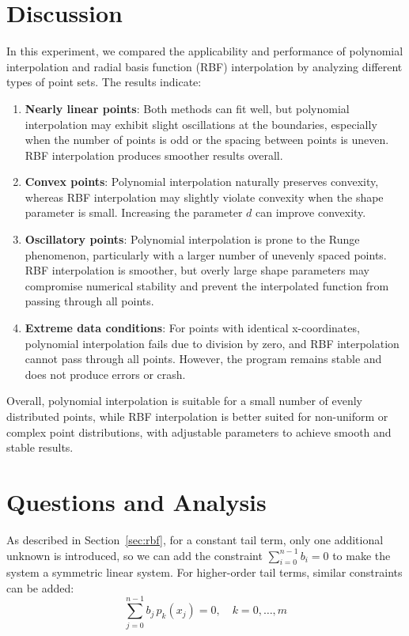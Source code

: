 \documentclass[12pt,a4paper]{report}
\begin{document}
    \chapter{Discussion}
        In this experiment, we compared the applicability and performance of polynomial interpolation and radial basis function (RBF) interpolation by analyzing different types of point sets. The results indicate:

        \begin{enumerate}
            \item \textbf{Nearly linear points}: Both methods can fit well, but polynomial interpolation may exhibit slight oscillations at the boundaries, especially when the number of points is odd or the spacing between points is uneven. RBF interpolation produces smoother results overall.
            \item \textbf{Convex points}: Polynomial interpolation naturally preserves convexity, whereas RBF interpolation may slightly violate convexity when the shape parameter is small. Increasing the parameter $d$ can improve convexity.
            \item \textbf{Oscillatory points}: Polynomial interpolation is prone to the Runge phenomenon, particularly with a larger number of unevenly spaced points. RBF interpolation is smoother, but overly large shape parameters may compromise numerical stability and prevent the interpolated function from passing through all points.
            \item \textbf{Extreme data conditions}: For points with identical x-coordinates, polynomial interpolation fails due to division by zero, and RBF interpolation cannot pass through all points. However, the program remains stable and does not produce errors or crash.
        \end{enumerate}

        Overall, polynomial interpolation is suitable for a small number of evenly distributed points, while RBF interpolation is better suited for non-uniform or complex point distributions, with adjustable parameters to achieve smooth and stable results.

    \chapter{Questions and Analysis}
        As described in Section~\ref{sec:rbf}, for a constant tail term, only one additional unknown is introduced, so we can add the constraint $\sum_{i=0}^{n-1} b_{i} = 0$ to make the system a symmetric linear system. For higher-order tail terms, similar constraints can be added:
        \begin{equation*}            
            \sum_{j=0}^{n-1} b_{j}\,p_{k}(x_{j}) = 0, \quad k = 0, \dots, m
        \end{equation*}
\end{document}
